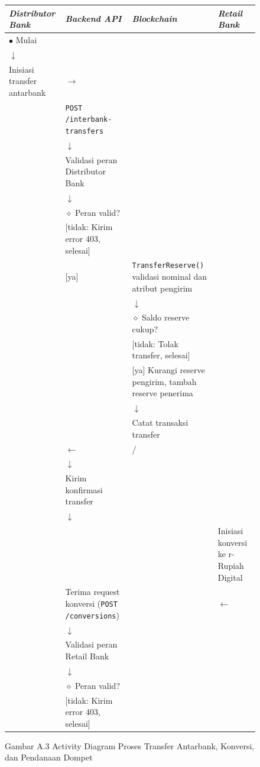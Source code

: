 \documentclass[12pt,a4paper]{article}
\begin{document}
\begin{figure}[H]
\centering
\caption{Gambar A.3 Activity Diagram Proses Transfer Antarbank, Konversi, dan Pendanaan Dompet}
\label{fig:ad03}
\begin{tabular}{@{}p{2.4cm}|p{3cm}|p{3cm}|p{3cm}@{}}
\textit{\textbf{Distributor Bank}} & \textit{\textbf{Backend API}} & \textit{\textbf{Blockchain}} & \textit{\textbf{Retail Bank}} \\
\hline
$\bullet$ Mulai & & & \\
$\downarrow$ & & & \\
Inisiasi transfer antarbank & $\rightarrow$ & & \\
& \texttt{POST /interbank-transfers} & & \\
& $\downarrow$ & & \\
& Validasi peran Distributor Bank & & \\
& $\downarrow$ & & \\
& $\diamond$ Peran valid? & & \\
& [tidak: Kirim error 403, selesai] & & \\
& [ya] & \texttt{TransferReserve()} validasi nominal dan atribut pengirim & \\
& & $\downarrow$ & \\
& & $\diamond$ Saldo reserve cukup? & \\
& & [tidak: Tolak transfer, selesai] & \\
& & [ya] Kurangi reserve pengirim, tambah reserve penerima & \\
& & $\downarrow$ & \\
& & Catat transaksi transfer & \\
& $\leftarrow$ & / & \\
& $\downarrow$ & & \\
& Kirim konfirmasi transfer & & \\
& $\downarrow$ & & \\
& & & Inisiasi konversi ke r-Rupiah Digital \\
& Terima request konversi (\texttt{POST /conversions}) & & $\leftarrow$ \\
& $\downarrow$ & & \\
& Validasi peran Retail Bank & & \\
& $\downarrow$ & & \\
& $\diamond$ Peran valid? & & \\
& [tidak: Kirim error 403, selesai] & & \\

\end{tabular}
\end{figure}
\end{document}
